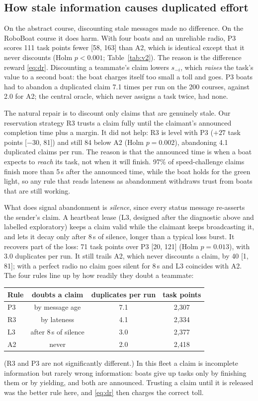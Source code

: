 \documentclass[11pt]{article}
\theoremstyle{definition}
\begin{document}
\subsection{How stale information causes duplicated effort}
On the abstract course, discounting stale messages made no difference. On the RoboBoat course it does harm. With four boats and an unreliable radio, P3 scores 111 task points fewer [58, 163] than A2, which is identical except that it never discounts (Holm $p<0.001$; Table~\ref{tab:v2}). The reason is the difference reward \eqref{eq:dr}. Discounting a teammate's claim lowers $s_{-i}$, which \emph{raises} the task's value to a second boat: the boat charges itself too small a toll and goes. P3 boats had to abandon a duplicated claim 7.1 times per run on the 200 courses, against 2.0 for A2; the central oracle, which never assigns a task twice, had none.

The natural repair is to discount only claims that are genuinely stale. Our reservation strategy R3 trusts a claim fully until the claimant's announced completion time plus a margin. It did not help: R3 is level with P3 ($+27$ task points [$-30$, 81]) and still 84 below A2 (Holm $p=0.002$), abandoning 4.1 duplicated claims per run. The reason is that the announced time is when a boat expects to \emph{reach} its task, not when it will finish. 97\% of speed-challenge claims finish more than 5\,s after the announced time, while the boat holds for the green light, so any rule that reads lateness as abandonment withdraws trust from boats that are still working.

What does signal abandonment is \emph{silence}, since every status message re-asserts the sender's claim. A heartbeat lease (L3, designed after the diagnostic above and labelled exploratory) keeps a claim valid while the claimant keeps broadcasting it, and lets it decay only after 8\,s of silence, longer than a typical loss burst. It recovers part of the loss: 71 task points over P3 [20, 121] (Holm $p=0.013$), with 3.0 duplicates per run. It still trails A2, which never discounts a claim, by 40 [1, 81]; with a perfect radio no claim goes silent for 8\,s and L3 coincides with A2. The four rules line up by how readily they doubt a teammate:
\begin{center}\small
\begin{tabular}{lccc}
\toprule
Rule & doubts a claim & duplicates per run & task points\\\midrule
P3 & by message age & 7.1 & 2{,}307\\
R3 & by lateness & 4.1 & 2{,}334\\
L3 & after 8\,s of silence & 3.0 & 2{,}377\\
A2 & never & 2.0 & 2{,}418\\\bottomrule
\end{tabular}
\end{center}
(R3 and P3 are not significantly different.) In this fleet a claim is incomplete information but rarely wrong information: boats give up tasks only by finishing them or by yielding, and both are announced. Trusting a claim until it is released was the better rule here, and \eqref{eq:dr} then charges the correct toll.
\end{document}

